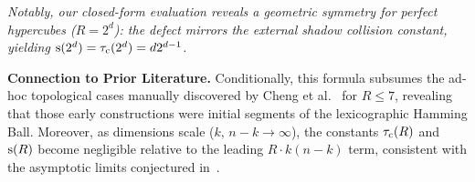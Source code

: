 \noindent \small \textit{Notably, our closed-form evaluation reveals a geometric
symmetry for perfect hypercubes ($R=2^d$): the defect mirrors the external
shadow collision constant, yielding $\mathrm{s}(2^d) = \tau_{\mathrm{c}}(2^d) = d 2^{d-1}$.}

\medskip
\noindent \textbf{Connection to Prior Literature.} Conditionally, this formula
subsumes the ad-hoc topological cases manually discovered by Cheng et al.\
\cite{cheng2022extraconnectivity} for $R \le 7$, revealing that those early
constructions were initial segments of the lexicographic Hamming Ball. Moreover,
as dimensions scale ($k,\, n{-}k \to \infty$), the constants $\tau_{\mathrm{c}}(R)$ and
$\mathrm{s}(R)$ become negligible relative to the leading $R \cdot k(n-k)$ term,
consistent with the asymptotic limits conjectured
in~\cite{cheng2022extraconnectivity}.
